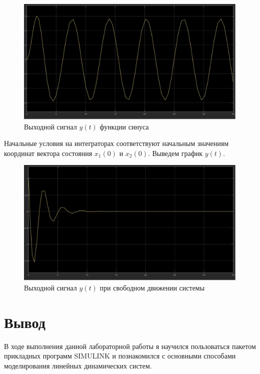 \documentclass[a4paper, 12pt]{article}
\begin{document}
    \begin{figure}[H]
        \centering
        \includegraphics[scale=0.3]{sin_y_2.jpg}
        \captionsetup{skip=0pt}
        \caption{Выходной сигнал $y(t)$ функции синуса}
        \label{fig:sin_y_2}
    \end{figure}
    Начальные условия на интеграторах соответствуют начальным значениям координат вектора состояния $x_1(0)$ и $x_2(0)$.
    Выведем график $y(t)$.
    \begin{figure}[H]
        \centering
        \includegraphics[scale=0.3]{null_y_2.jpg}
        \captionsetup{skip=0pt}
        \caption{Выходной сигнал $y(t)$ при свободном движении системы}
        \label{fig:null_y_2}
    \end{figure}


    \section{Вывод}
    В ходе выполнения данной лабораторной работы я научился пользоваться пакетом
    прикладных программ SIMULINK и познакомился с основными способами моделирования линейных динамических систем.
\end{document}
